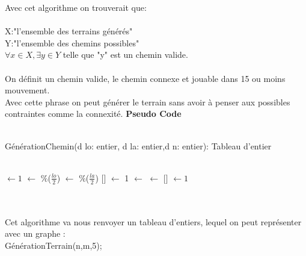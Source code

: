 \documentclass{article}
\begin{document}
Avec cet algorithme on trouverait que:\\~\\
X:"l'ensemble des terrains générés" \\
Y:"l'ensemble des chemins possibles"\\
\(\forall x \in X, \exists y \in Y\) telle que "y" est un chemin valide.\\~\\
On définit un chemin valide, le chemin connexe et jouable dans 15 ou moins mouvement.\\
Avec cette phrase on peut générer le terrain sans avoir à penser aux possibles contraintes comme la connexité.
\newpage
\textbf{\Large{Pseudo Code}}\\~\\
\begin{algorithm}[H]
	\caption{GénérationChemin(d lo: entier, d la: entier,d n: entier): Tableau d'entier}
	\Debut\\
	\BlankLine
	\I $\leftarrow 1$\;
	\Va $\leftarrow$ \Random{}$\%$($\frac{lo}{2}$)\;
	\Vb $\leftarrow$ \Random{}$\%$($\frac{la}{2}$)\;
	\TAB{\Va}$[$\Vb$]$ $\leftarrow$ 1\;
	\While{\I $<$ \N}
	{
		\DIR $\leftarrow$ \GDIR{}\;
		\V $\leftarrow$ \NPOS{\V ,\DIR}\;
		{
			\TAB{\Va}$[$\Vb$]$ $\leftarrow 1$\;
		}
	}
	\Return \TAB\;
\end{algorithm}
~\\~\\
\newpage
Cet algorithme va nous renvoyer un tableau d'entiers, lequel on peut représenter avec un graphe :\\
GénérationTerrain(n,m,5);\\
\end{document}
